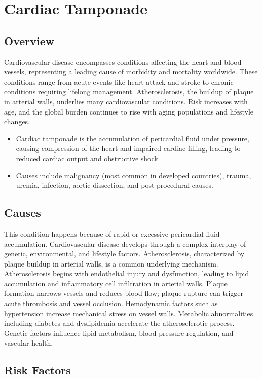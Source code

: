 \chapter{Cardiac Tamponade}
\label{sec:Cardiac Tamponade}

\section{Overview}
Cardiovascular disease encompasses conditions affecting the heart and blood vessels, representing a leading cause of morbidity and mortality worldwide. These conditions range from acute events like heart attack and stroke to chronic conditions requiring lifelong management. Atherosclerosis, the buildup of plaque in arterial walls, underlies many cardiovascular conditions. Risk increases with age, and the global burden continues to rise with aging populations and lifestyle changes.

\begin{itemize}[noitemsep]
  \item Cardiac tamponade is the accumulation of pericardial fluid under pressure, causing compression of the heart and impaired cardiac filling, leading to reduced cardiac output and obstructive shock
  \item Causes include malignancy (most common in developed countries), trauma, uremia, infection, aortic dissection, and post-procedural causes.
\end{itemize}
\section{Causes}
This condition happens because of rapid or excessive pericardial fluid accumulation. Cardiovascular disease develops through a complex interplay of genetic, environmental, and lifestyle factors. Atherosclerosis, characterized by plaque buildup in arterial walls, is a common underlying mechanism. Atherosclerosis begins with endothelial injury and dysfunction, leading to lipid accumulation and inflammatory cell infiltration in arterial walls. Plaque formation narrows vessels and reduces blood flow; plaque rupture can trigger acute thrombosis and vessel occlusion. Hemodynamic factors such as hypertension increase mechanical stress on vessel walls. Metabolic abnormalities including diabetes and dyslipidemia accelerate the atherosclerotic process. Genetic factors influence lipid metabolism, blood pressure regulation, and vascular health.
\section{Risk Factors}


